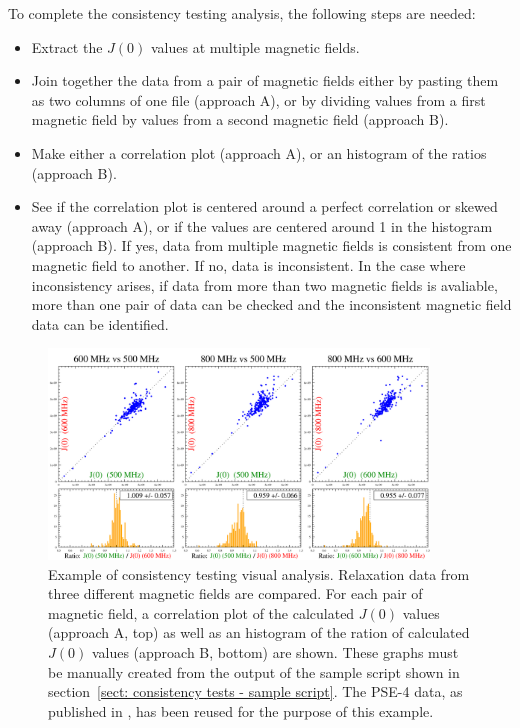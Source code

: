 To complete the consistency testing analysis, the following steps are needed:

\begin{itemize}
\item Extract the $J(0)$ values at multiple magnetic fields.
\item Join together the data from a pair of magnetic fields either by pasting them as two columns of one file (approach A), or by dividing values from a first magnetic field by values from a second magnetic field (approach B).
\item Make either a correlation plot (approach A), or an histogram of the ratios (approach B).
\item See if the correlation plot is centered around a perfect correlation or skewed away (approach A), or if the values are centered around 1 in the histogram (approach B).  If yes, data from multiple magnetic fields is consistent from one magnetic field to another.  If no, data is inconsistent.  In the case where inconsistency arises, if data from more than two magnetic fields is avaliable, more than one pair of data can be checked and the inconsistent magnetic field data can be identified.
\end{itemize}

\begin{figure}[h]
\label{fig: consistency analysis}
\centerline{\includegraphics[width=0.9\textwidth, bb=5 2 1244 669]{graphics/analyses/consistency_testing/consistency__J0_PSE-4}}
\caption[Example of consistency testing visual analysis]{Example of consistency testing visual analysis.  Relaxation data from three different magnetic fields are compared.  For each pair of magnetic field, a correlation plot of the calculated $J(0)$ values (approach A, top) as well as an histogram of the ration of calculated $J(0)$ values (approach B, bottom) are shown.  These graphs must be manually created from the output of the sample script shown in section~\ref{sect: consistency tests - sample script}.  The PSE-4 data, as published in \citet{MorinGagne09b}, has been reused for the purpose of this example.}
\end{figure}

